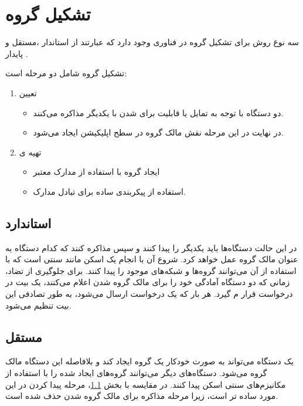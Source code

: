 \section{تشکیل گروه}
سه نوع روش برای تشکیل گروه در فناوری
وجود دارد که عبارتند از استاندار
،مستقل
و پایدار
.

تشکیل گروه شامل دو مرحله است:
\begin{enumerate}
	\item تعیین 
	\begin{itemize}
		\item  دو دستگاه با توجه به تمایل یا قابلیت برای  شدن با یکدیگر مذاکره می‌کنند.
		\item در نهایت در این مرحله نقش مالک گروه در سطح اپلیکیشن ایجاد می‌شود. 
	\end{itemize}
	\item تهیه ی 
	\begin{itemize}
		\item ایجاد  گروه با استفاده از مدارک معتبر
		\item استفاده از پیکربندی ساده  برای تبادل مدارک.
	\end{itemize}
\end{enumerate}

\subsection{استاندارد}\label{subsec:Standard}
در این حالت دستگاه‌ها باید یکدیگر را پیدا 
کنند و سپس مذاکره کنند که کدام دستگاه به عنوان  مالک گروه عمل خواهد کرد. شروع آن با انجام یک اسکن مانند 
 سنتی است که با استفاده از آن می‌توانند گروه‌ها و شبکه‌های
  موجود را پیدا کنند. برای جلوگیری از تضاد، زمانی که دو دستگاه آمادگی خود را برای مالک گروه شدن اعلام می‌کنند، یک بیت 
   در درخواست قرار م‌ گیرد. هر بار که یک درخواست ارسال می‌شود، به طور تصادفی این بیت تنظیم می‌شود.
\subsection{مستقل}
یک دستگاه می‌تواند به صورت خودکار یک گروه  ایجاد کند و بلافاصله این دستگاه مالک گروه می‌شود. دستگاه‌های دیگر می‌توانند گروه‌های ایجاد شده را با استفاده از مکانیزم‌های سنتی اسکن پیدا کنند. در مقایسه با بخش \ref{subsec:Standard}، مرحله پیدا کردن در این مورد ساده تر است، زیرا مرحله مذاکره برای مالک گروه شدن حذف شده است.
